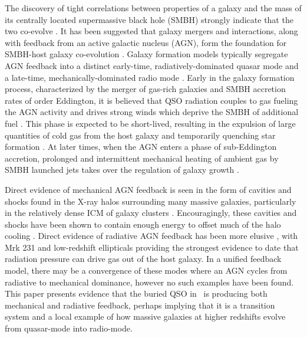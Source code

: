 \documentclass[useAMS,usenatbib]{mn2e}
\begin{document}
The discovery of tight correlations between properties of a galaxy and
the mass of its centrally located supermassive black hole (SMBH)
strongly indicate that the two co-evolve
\citep[\eg][]{1995ARA&A..33..581K, magorrian}. It has been suggested
that galaxy mergers and interactions, along with feedback from an
active galactic nucleus (AGN), form the foundation for SMBH-host
galaxy co-evolution \citep[\eg][]{2000MNRAS.311..576K}. Galaxy
formation models typically segregate AGN feedback into a distinct
early-time, radiatively-dominated quasar mode
\citep[\eg][]{2005Natur.435..629S} and a late-time,
mechanically-dominated radio mode \citep[\eg][]{croton06}. Early in
the galaxy formation process, characterized by the merger of gas-rich
galaxies and SMBH accretion rates of order Eddington, it is believed
that QSO radiation couples to gas fueling the AGN activity and drives
strong winds which deprive the SMBH of additional fuel
\citep[\eg][]{1998A&A...331L...1S}. This phase is expected to be
short-lived, resulting in the expulsion of large quantities of cold
gas from the host galaxy and temporarily quenching star formation
\citep[\eg][]{2006ApJ...642L.107N}. At later times, when the AGN
enters a phase of sub-Eddington accretion, prolonged and intermittent
mechanical heating of ambient gas by SMBH launched jets takes over the
regulation of galaxy growth \citep[see][for reviews]{cfreview,
  mcnamrev}.

Direct evidence of mechanical AGN feedback is seen in the form of
cavities and shocks found in the X-ray halos surrounding many massive
galaxies, particularly in the relatively dense ICM of galaxy clusters
\citep[\eg][]{perseus1, 2000ApJ...534L.135M}.  Encouragingly, these
cavities and shocks have been shown to contain enough energy to offset
much of the halo cooling \citep{perseus2, birzan04, dunn06,
  rafferty06, 2007ApJ...665.1057F}. Direct evidence of radiative AGN
feedback has been more elusive \citep[see][for a
  review]{2005ARA&A..43..769V}, with Mrk 231
\citep{2010arXiv1006.1655F} and low-redshift ellipticals
\citep{2009ApJ...690.1672S} providing the strongest evidence to date
that radiation pressure can drive gas out of the host galaxy. In a
unified feedback model, there may be a convergence of these modes
where an AGN cycles from radiative to mechanical dominance, however no
such examples have been found. This paper presents evidence that the
buried QSO in \irs\ is producing both mechanical and radiative
feedback, perhaps implying that it is a transition system and a local
example of how massive galaxies at higher redshifts evolve from
quasar-mode into radio-mode.
\end{document}
